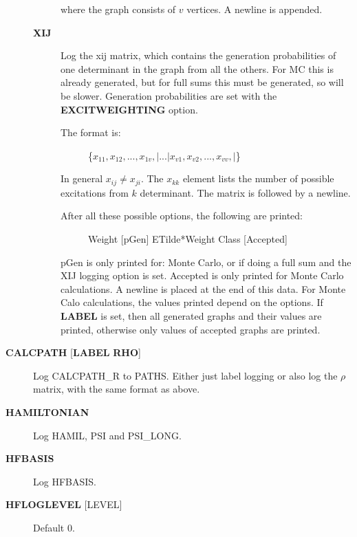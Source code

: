 \documentclass[openany,a4paper,10pt,english]{manual}
\begin{document}
\begin{description}
\begin{description}
\begin{description}
\end{description}

where the graph consists of $v$  vertices.  A newline is appended.

\item[\textbf{XIJ}] \leavevmode
Log the xij matrix, which contains the generation probabilities
of one determinant in the graph from all the others.  For MC this
is already generated, but for full sums this must be generated,
so will be slower.  Generation probabilities are set with the
\textbf{EXCITWEIGHTING} option.
\begin{description}
\item[The format is:] \leavevmode
\{$x_{11}, x_{12}, ..., x_{1v},| ... | x_{v1}, x_{v2}, ..., x_{vv},|$\}

\end{description}

In general $x_{ij} \ne x_{ji}$.  The $x_{kk}$ element lists
the number of possible excitations from $k$ determinant.
The matrix is followed by a newline.
\begin{description}
\item[After all these possible options, the following are printed:] \leavevmode
Weight {[}pGen{]} ETilde*Weight Class {[}Accepted{]}

\end{description}

pGen is only printed for: Monte Carlo, or if doing a full sum
and the XIJ logging option is set.  Accepted is only printed
for Monte Carlo calculations.  A newline is placed at the end
of this data.  For Monte Calo calculations, the values printed
depend on the options.  If \textbf{LABEL} is set, then all generated
graphs and their values are printed, otherwise only values of
accepted graphs are printed.

\end{description}

\item[\textbf{CALCPATH} {[}\textbf{LABEL} \textbf{RHO}{]}] \leavevmode
Log CALCPATH\_R to PATHS.  Either just label logging or also
log the $\rho$ matrix, with the same format as above.

\item[\textbf{HAMILTONIAN}] \leavevmode
Log HAMIL, PSI and PSI\_LONG.

\item[\textbf{HFBASIS}] \leavevmode
Log HFBASIS.

\item[\textbf{HFLOGLEVEL} {[}LEVEL{]}] \leavevmode
Default 0.


\end{description}
\end{document}

